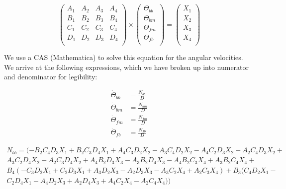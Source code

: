 \documentclass[11pt, landscape]{article}
\begin{document}
\begin{equation}
  \begin{pmatrix}
    A_1 & A_2 & A_3 & A_4 \\
    B_1 & B_2 & B_3 & B_4 \\
    C_1 & C_2 & C_3 & C_4 \\
    D_1 & D_2 & D_3 & D_4 \\    
  \end{pmatrix}
\times
  \begin{pmatrix}
    \Theta_{bb} \\
    \Theta_{bm} \\
    \Theta_{fm} \\
    \Theta_{fb} \\
  \end{pmatrix}
=
  \begin{pmatrix}
    X_1 \\
    X_2 \\
    X_3 \\
    X_4 \\
  \end{pmatrix}
\end{equation}

We use a CAS (Mathematica) to solve this equation for the angular velocities. We arrive at the following expressions, which we have broken up into numerator and denominator for legibility:

\begin{align}
\dot{\Theta}_{bb} &= \frac{N_{bb}}{D} \\
\dot{\Theta}_{bm} &= \frac{N_{bm}}{D} \\
\dot{\Theta}_{fm} &= \frac{N_{fm}}{D} \\
\dot{\Theta}_{fb} &= \frac{N_{fb}}{D}
\end{align}

\begin{multline}
N_{bb} =
(-B_2 C_4 D_3 X_1 + B_2 C_3 D_4 X_1 + A_4 C_3 D_2 X_2 - A_3 C_4 D_2 X_2 - A_4 C_2 D_3 X_2 + A_2 C_4 D_3 X_2 +\\
 A_3 C_2 D_4 X_2 - A_2 C_3 D_4 X_2 + A_4 B_2 D_3 X_3 - A_3 B_2 D_4 X_3 - A_4 B_2 C_3 X_4 + A_3 B_2 C_4 X_4 +\\
B_4 (-C_3 D_2 X_1 + C_2 D_3 X_1 + A_3 D_2 X_3 - A_2 D_3 X_3 - A_3 C_2 X_4 + A_2 C_3 X_4) + B_3 (C_4 D_2 X_1 - \\
C_2 D_4 X_1 - A_4 D_2 X_3 + A_2 D_4 X_3 + A_4 C_2 X_4 - A_2 C_4 X_4)) \\
\end{multline}
\end{document}
